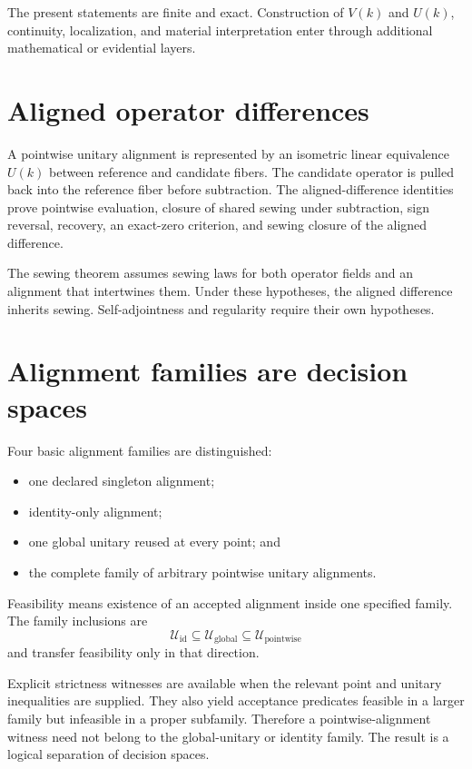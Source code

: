 The present statements are finite and exact. Construction of $V(k)$ and $U(k)$,
continuity, localization, and material interpretation enter through additional
mathematical or evidential layers.

\section{Aligned operator differences}

A pointwise unitary alignment is represented by an isometric linear equivalence $U(k)$
between reference and candidate fibers. The candidate operator is pulled back into the
reference fiber before subtraction. The aligned-difference identities prove pointwise
evaluation, closure of shared sewing under subtraction, sign reversal, recovery, an
exact-zero criterion, and sewing closure of the aligned difference.

The sewing theorem assumes sewing laws for both operator fields and an alignment that
intertwines them. Under these hypotheses, the aligned difference inherits sewing.
Self-adjointness and regularity require their own hypotheses.

\section{Alignment families are decision spaces}

Four basic alignment families are distinguished:

\begin{itemize}
  \item one declared singleton alignment;
  \item identity-only alignment;
  \item one global unitary reused at every point; and
  \item the complete family of arbitrary pointwise unitary alignments.
\end{itemize}

Feasibility means existence of an accepted alignment inside one specified family. The
family inclusions are
\[
  \mathcal U_{\mathrm{id}}
  \subseteq
  \mathcal U_{\mathrm{global}}
  \subseteq
  \mathcal U_{\mathrm{pointwise}}
\]
and transfer feasibility only in that direction.

Explicit strictness witnesses are available when the relevant point and unitary
inequalities are supplied. They also yield acceptance predicates feasible in a larger
family but infeasible in a proper subfamily. Therefore a
pointwise-alignment witness need not belong to the global-unitary or identity family.
The result is a logical separation of decision spaces.

